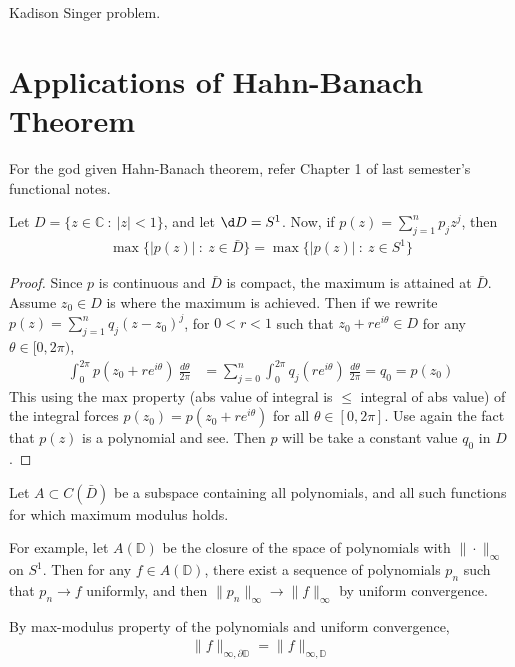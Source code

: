 

\begin{example}
  Kadison Singer problem.
\end{example}

\section{Applications of Hahn-Banach Theorem}
For the god given Hahn-Banach theorem, refer Chapter 1 of last
semester's functional notes.

\begin{proposition}
  Let $D = \{ z \in \mathbb{C}  \ : \  |z|< 1 \}$, and let $\d D = S^1$.
  Now, if $p(z) = \sum_{j = 1}^{n} p_j z^j$, then
  \begin{align*}
    \max \{ |p(z)|  \ : \  z \in \bar{D}  \} = \max \{ |p(z)|  \ :
    \ z \in S^1\}
  \end{align*}
\end{proposition}
\begin{proof}
  Since $p$ is continuous and $ \bar{D}$ is compact, the maximum is
  attained at $ \bar{D}$. Assume $ z_0 \in D$ is where the maximum is
  achieved. Then if we rewrite $p(z) = \sum_{j = 1}^{n} q_j (z -
  z_0)^j$, for $0< r< 1$ such that $z_0 + re^{i \theta} \in D$ for
  any $\theta \in [0, 2 \pi)$,
  \begin{align*}
    \int_{0}^{2\pi}  p(z_0 + re^{i\theta}) \ \frac{d\theta}{2\pi} &=
    \sum_{j = 0}^{n} \int_{0}^{2\pi}  q_j(re^{i\theta})
    \ \frac{d\theta}{2\pi} = q_0 = p(z_0)
  \end{align*}
  This using the max property (abs value of integral is $\le$
  integral of abs value) of the integral forces $p(z_0) = p(z_0
  + re^{i\theta})$ for all $\theta \in [0, 2 \pi]$.  Use again the
  fact that $p(z)$ is a polynomial and see. Then $p$ will be
  take a constant value $q_0$ in $D$.
\end{proof}

\begin{example}
  Let $A \subset C(\bar{D})$ be a subspace containing all
  polynomials, and all such functions for which maximum modulus
  holds.

  For example, let $A(\mathbb{D})$ be the closure of the space
  of polynomials with $\|\cdot\|_\infty$ on $S^1$. Then for any $ f
  \in A(\mathbb{D})$, there exist a sequence of polynomials $p_n$
  such that $p_n \to f$ uniformly, and  then $\|p_n\|_\infty \to
  \|f\|_\infty$ by uniform convergence.

  By max-modulus property of the polynomials and uniform convergence,
  \begin{align*}
    \|f\|_{\infty, \partial \mathbb{D}} = \| f\|_{\infty, \mathbb{D}}
  \end{align*}
\end{example}
